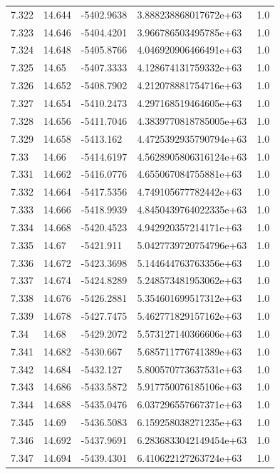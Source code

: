 \begin{tabular}{lllll}
7.322 & 14.644 & -5402.9638 & 3.888238868017672e+63 & 1.0 \\
7.323 & 14.646 & -5404.4201 & 3.966786503495785e+63 & 1.0 \\
7.324 & 14.648 & -5405.8766 & 4.046920906466491e+63 & 1.0 \\
7.325 & 14.65 & -5407.3333 & 4.128674131759332e+63 & 1.0 \\
7.326 & 14.652 & -5408.7902 & 4.212078881754716e+63 & 1.0 \\
7.327 & 14.654 & -5410.2473 & 4.297168519464605e+63 & 1.0 \\
7.328 & 14.656 & -5411.7046 & 4.3839770818785005e+63 & 1.0 \\
7.329 & 14.658 & -5413.162 & 4.4725392935790794e+63 & 1.0 \\
7.33 & 14.66 & -5414.6197 & 4.5628905806316124e+63 & 1.0 \\
7.331 & 14.662 & -5416.0776 & 4.655067084755881e+63 & 1.0 \\
7.332 & 14.664 & -5417.5356 & 4.749105677782442e+63 & 1.0 \\
7.333 & 14.666 & -5418.9939 & 4.8450439764022335e+63 & 1.0 \\
7.334 & 14.668 & -5420.4523 & 4.942920357214171e+63 & 1.0 \\
7.335 & 14.67 & -5421.911 & 5.0427739720754796e+63 & 1.0 \\
7.336 & 14.672 & -5423.3698 & 5.144644763763356e+63 & 1.0 \\
7.337 & 14.674 & -5424.8289 & 5.248573481953062e+63 & 1.0 \\
7.338 & 14.676 & -5426.2881 & 5.354601699517312e+63 & 1.0 \\
7.339 & 14.678 & -5427.7475 & 5.462771829157162e+63 & 1.0 \\
7.34 & 14.68 & -5429.2072 & 5.573127140366606e+63 & 1.0 \\
7.341 & 14.682 & -5430.667 & 5.685711776741389e+63 & 1.0 \\
7.342 & 14.684 & -5432.127 & 5.800570773637531e+63 & 1.0 \\
7.343 & 14.686 & -5433.5872 & 5.917750076185106e+63 & 1.0 \\
7.344 & 14.688 & -5435.0476 & 6.037296557667371e+63 & 1.0 \\
7.345 & 14.69 & -5436.5083 & 6.159258038271235e+63 & 1.0 \\
7.346 & 14.692 & -5437.9691 & 6.2836833042149454e+63 & 1.0 \\
7.347 & 14.694 & -5439.4301 & 6.410622127263724e+63 & 1.0 \\

\end{tabular}
